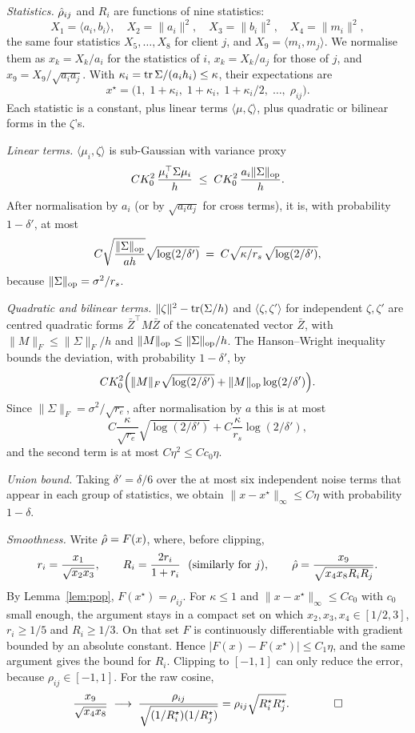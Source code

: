 \emph{Statistics.} $\hat\rho_{ij}$ and $R_i$ are functions of nine statistics:
\[
X_1=\langle a_i,b_i\rangle,\quad X_2=\|a_i\|^2,\quad X_3=\|b_i\|^2,\quad X_4=\|m_i\|^2,
\]
the same four statistics $X_5,\dots,X_8$ for client $j$, and $X_9=\langle m_i,m_j\rangle$. We normalise them as $x_k=X_k/a_i$ for the statistics of $i$, $x_k=X_k/a_j$ for those of $j$, and $x_9=X_9/\sqrt{a_ia_j}$. With $\kappa_i=\operatorname{tr}\Sigma/(a_ih_i)\le\kappa$, their expectations are
\[
x^\star=\big(1,\;1+\kappa_i,\;1+\kappa_i,\;1+\kappa_i/2,\;\dots,\;\rho_{ij}\big).
\]
Each statistic is a constant, plus linear terms $\langle\mu,\zeta\rangle$, plus quadratic or bilinear forms in the $\zeta$'s.

\emph{Linear terms.} $\langle\mu_i,\zeta\rangle$ is sub-Gaussian with variance proxy
\[
CK_0^2\,\frac{\mu_i^\top\Sigma\mu_i}{h}\;\le\;CK_0^2\,\frac{a_i\|\Sigma\|_{\mathrm{op}}}{h}.
\]
After normalisation by $a_i$ (or by $\sqrt{a_ia_j}$ for cross terms), it is, with probability $1-\delta'$, at most
\[
C\sqrt{\frac{\|\Sigma\|_{\mathrm{op}}}{ah}}\sqrt{\log(2/\delta')}
\;=\;C\sqrt{\kappa/r_s}\,\sqrt{\log(2/\delta')},
\]
because $\|\Sigma\|_{\mathrm{op}}=\sigma^2/r_s$.

\emph{Quadratic and bilinear terms.} $\|\zeta\|^2-\operatorname{tr}(\Sigma/h)$ and $\langle\zeta,\zeta'\rangle$ for independent $\zeta,\zeta'$ are centred quadratic forms $\bar Z^\top M\bar Z$ of the concatenated vector $\bar Z$, with $\|M\|_F\le\|\Sigma\|_F/h$ and $\|M\|_{\mathrm{op}}\le\|\Sigma\|_{\mathrm{op}}/h$. The Hanson--Wright inequality~\citep{rudelson2013hansonwright} bounds the deviation, with probability $1-\delta'$, by
\[
C K_0^2\Big(\|M\|_F\sqrt{\log(2/\delta')}+\|M\|_{\mathrm{op}}\log(2/\delta')\Big).
\]
Since $\|\Sigma\|_F=\sigma^2/\sqrt{r_e}$, after normalisation by $a$ this is at most
\[
C\frac{\kappa}{\sqrt{r_e}}\sqrt{\log(2/\delta')}+C\frac{\kappa}{r_s}\log(2/\delta'),
\]
and the second term is at most $C\eta^2\le Cc_0\eta$.

\emph{Union bound.} Taking $\delta'=\delta/6$ over the at most six independent noise terms that appear in each group of statistics, we obtain $\|x-x^\star\|_\infty\le C\eta$ with probability $1-\delta$.

\emph{Smoothness.} Write $\hat\rho=F(x)$, where, before clipping,
\[
r_i=\frac{x_1}{\sqrt{x_2x_3}},\qquad R_i=\frac{2r_i}{1+r_i}\ \ \text{(similarly for $j$)},\qquad
\hat\rho=\frac{x_9}{\sqrt{x_4x_8R_iR_j}}.
\]
By Lemma~\ref{lem:pop}, $F(x^\star)=\rho_{ij}$. For $\kappa\le1$ and $\|x-x^\star\|_\infty\le Cc_0$ with $c_0$ small enough, the argument stays in a compact set on which $x_2,x_3,x_4\in[1/2,3]$, $r_i\ge1/5$ and $R_i\ge1/3$. On that set $F$ is continuously differentiable with gradient bounded by an absolute constant. Hence $|F(x)-F(x^\star)|\le C_1\eta$, and the same argument gives the bound for $R_i$. Clipping to $[-1,1]$ can only reduce the error, because $\rho_{ij}\in[-1,1]$. For the raw cosine,
\[
\frac{x_9}{\sqrt{x_4x_8}}\;\longrightarrow\;\frac{\rho_{ij}}{\sqrt{(1/R^\star_i)(1/R^\star_j)}}=\rho_{ij}\sqrt{R_i^\star R_j^\star}.
\qquad\qed
\]

